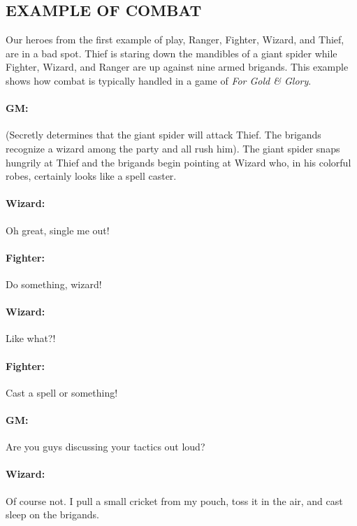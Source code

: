 \begin{multicols}{2}
\begin{minipage}{\columnwidth}
\end{minipage}

\section{EXAMPLE OF COMBAT}

Our heroes from the first example of play, Ranger, Fighter, Wizard, and Thief, are in a bad spot.  Thief is staring down the mandibles of a giant spider while Fighter, Wizard, and Ranger are up against nine armed brigands.  This example shows how combat is typically handled in a game of \textit{For Gold \& Glory}\texttrademark{}.

\paragraph{GM:} (Secretly determines that the giant spider will attack Thief.  The brigands recognize a wizard among the party and all rush him).  The giant spider snaps hungrily at Thief and the brigands begin pointing at Wizard who, in his colorful robes, certainly looks like a spell caster.

\paragraph{Wizard:} Oh great, single me out!

\paragraph{Fighter:}  Do something, wizard!

\paragraph{Wizard:}  Like what?!

\paragraph{Fighter:}  Cast a spell or something!

\paragraph{GM:}  Are you guys discussing your tactics out loud?

\paragraph{Wizard:}  Of course not.  I pull a small cricket from my pouch, toss it in the air, and cast sleep on the brigands.


\end{multicols}
